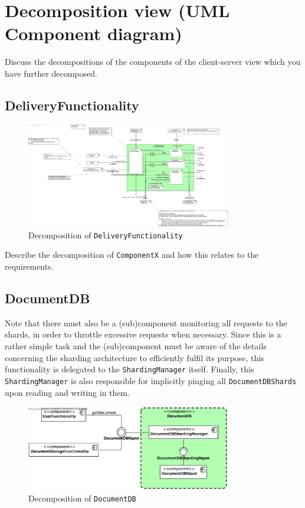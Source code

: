 \documentclass[a4paper,10pt]{article}
\begin{document}
\section{Decomposition view (UML Component diagram)}\label{sec:decomposition}
Discuss the decompositions of the components of the client-server view which
you have further decomposed.

\subsection{DeliveryFunctionality}\label{subsec:decomp-DeliveryFunctionality}
\begin{figure}[!htp]
	\centering
	\includegraphics[width=0.8\textwidth]{DeliveryFunctionality.png}
	\caption{Decomposition of \texttt{DeliveryFunctionality}}
	\label{fig:decomp-DeliveryFunctionality}
\end{figure}
\FloatBarrier

Describe the decomposition of \texttt{ComponentX} and how this relates to the
requirements.

\subsection{DocumentDB}\label{subsec:decomp-DocumentDB}
Note that there must also be a (sub)component monitoring all requests to the shards, in order to throttle excessive requests when necessary. Since this is a rather simple task and the (sub)component must be aware of the details concerning the sharding architecture to efficiently fulfil its purpose, this functionality is delegated to the \texttt{ShardingManager} itself. Finally, this \texttt{ShardingManager} is also responsible for implicitly pinging all \texttt{DocumentDBShards} upon reading and writing in them.
\begin{figure}[!htp]
	\centering
	\includegraphics[width=0.8\textwidth]{DocumentDB.png}
	\caption{Decomposition of \texttt{DocumentDB}}
	\label{fig:decomp-DocumentDB}
\end{figure}
\FloatBarrier
\end{document}
